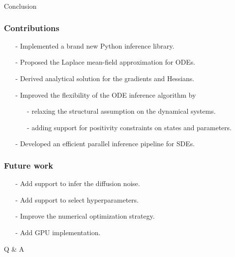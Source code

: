 \begin{frame}
    \begin{center}
        {\large Conclusion}
    \end{center}        
\end{frame}

\begin{frame}[t]
    \frametitle{Contributions}
    \begin{itemize}
        \item[-] Implemented a brand new Python inference library.
        \item[-] Proposed the Laplace mean-field approximation for ODEs.
        \item[-] Derived analytical solution for the gradients and Hessians.
        \item[-] Improved the flexibility of the ODE inference algorithm by 
        \begin{itemize}
            \item[-] relaxing the structural assumption on the dynamical systems.
            \item[-] adding support for positivity constraints on states and parameters.
        \end{itemize}
        \item[-] Developed an efficient parallel inference pipeline for SDEs.
    \end{itemize}
\end{frame}

\begin{frame}[t]
    \frametitle{Future work}
    \begin{itemize}
        \item[-] Add support to infer the diffusion noise.
        \item[-] Add support to select hyperparameters.
        \item[-] Improve the numerical optimization strategy.
        \item[-] Add GPU implementation.
    \end{itemize}
\end{frame}

\begin{frame}
    \begin{center}
        {\large Q \& A}
    \end{center}        
\end{frame}